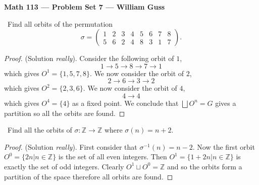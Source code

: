 \documentclass[11pt]{amsart}
\begin{document}
\begin{center}{\bf Math 113 --- Problem Set 7 --- William Guss} \end{center}


\bigskip


\medskip {}\ Find all orbits of the permutation 
\begin{equation*}
	\sigma = \begin{pmatrix}
		1 & 2 & 3 & 4 & 5 & 6 & 7 & 8 \\
		5 & 6 & 2 & 4 & 8 & 3 & 1 & 7
	\end{pmatrix}.
\end{equation*}
\begin{proof}
(Solution \emph{really}). Consider the following orbit of $1$,
\begin{equation*}
	1 \to 5 \to 8 \to7 \to 1
\end{equation*}
which gives $O^1 = \{1, 5, 7, 8\}$. We now consider the orbit of $2$,
\begin{equation*}
	2 \to 6 \to 3 \to 2
\end{equation*}
which gives $O^2 = \{2,3,6\}.$ We now consider the orbit of $4$,
\begin{equation*}
	4 \to 4
\end{equation*}
which gives $O^4 = \{4\}$ as a fixed point. We conclude that $\bigsqcup O^n = G$
gives a partition so all the orbits are found.
\end{proof}

\medskip {}\ Find all the orbits of $\sigma: \mathbb{Z} \to \mathbb{Z}$ where $\sigma(n) = n +2.$
\begin{proof}
(Solution \emph{really}). First consider that $\sigma^{-1}(n) = n -2.$ Now the first orbit $O^{0} = \{2n\mathrel{}|\mathrel{}n\in\mathbb{Z}\}$ is the set of all even integers. Then $O^{1} =  \{1+2n\mathrel{}|\mathrel{}n\in\mathbb{Z}\}$ is exactly the set of odd integers. Clearly $O^1 \sqcup O^0 = \mathbb{Z}$ and so the orbits form a partition of the space therefore all orbits are found.
\end{proof}
\end{document}
